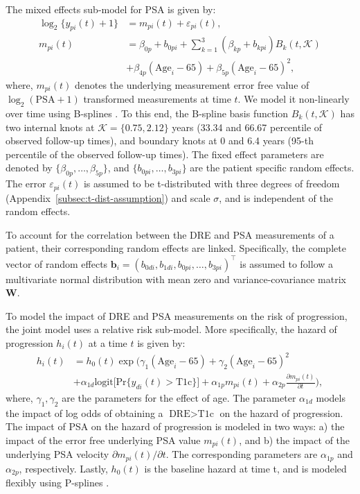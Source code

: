 The mixed effects sub-model for PSA is given by:
\begin{equation}
\label{eq:long_model_psa}
\begin{split}
    \log_2 \big\{y_{pi}(t) + 1\big\} &= m_{pi}(t) + \varepsilon_{pi}(t),\\
    m_{pi}(t) &= \beta_{0p} + b_{0pi} + \sum_{k=1}^3 (\beta_{kp} + b_{kpi})  B_k(t,\mathcal{K})\\ 
    &+ \beta_{4p} (\mbox{Age}_i-65) + \beta_{5p} (\mbox{Age}_i-65)^2,
    \end{split}
\end{equation}
where, $m_{pi}(t)$ denotes the underlying measurement error free value of $\log_2 (\mbox{PSA} + 1)$ transformed \citep{pearson1994mixed,lin2000latent} measurements at time $t$. We model it non-linearly over time using B-splines \citep{de1978practical}. To this end, the B-spline basis function $B_k(t, \mathcal{K})$ has two internal knots at $\mathcal{K} = \{0.75, 2.12\}$ years (33.34 and 66.67 percentile of observed follow-up times), and boundary knots at 0 and 6.4 years (95-th percentile of the observed follow-up times). The fixed effect parameters are denoted by ${\{\beta_{0p},\ldots,\beta_{5p}\}}$, and ${\{b_{0pi}, \ldots, b_{3pi}\}}$ are the patient specific random effects. The error $\varepsilon_{pi}(t)$ is assumed to be t-distributed with three degrees of freedom (Appendix~\ref{subsec:t-dist-assumption}) and scale $\sigma$, and is independent of the random effects. 

To account for the correlation between the DRE and PSA measurements of a patient, their corresponding random effects are linked. Specifically, the complete vector of random effects ${\boldsymbol{b}_i = (b_{0di}, b_{1di}, b_{0pi}, \ldots, b_{3pi})^\top}$ is assumed to follow a multivariate normal distribution with mean zero and variance-covariance matrix $\boldsymbol{W}$.

To model the impact of DRE and PSA measurements on the risk of progression, the joint model uses a relative risk sub-model. More specifically, the hazard of progression $h_i(t)$ at a time $t$ is given by:
\begin{equation}
\label{eq:rel_risk_model}
\begin{split}
    h_i(t) &= h_0(t) \exp\Big(\gamma_1 (\mbox{Age}_i-65) + \gamma_2 (\mbox{Age}_i-65)^2\\
    &+\alpha_{1d} \mbox{logit} \big[\mbox{Pr}\{y_{di}(t) > \mbox{T1c}\}\big]+ \alpha_{1p} m_{pi}(t) + \alpha_{2p} \frac{\partial m_{pi}(t)}{\partial {t}}\Big),
    \end{split}
\end{equation}
where, $\gamma_1, \gamma_2$ are the parameters for the effect of age. The parameter $\alpha_{1d}$ models the impact of log odds of obtaining a $\mbox{DRE} > \mbox{T1c}$ on the hazard of progression. The impact of PSA on the hazard of progression is modeled in two ways: a) the impact of the error free underlying PSA value $m_{pi}(t)$, and b) the impact of the underlying PSA velocity $\partial m_{pi}(t)/\partial {t}$. The corresponding parameters are $\alpha_{1p}$ and $\alpha_{2p}$, respectively. Lastly, $h_0(t)$ is the baseline hazard at time t, and is modeled flexibly using P-splines \citep{eilers1996flexible}.


